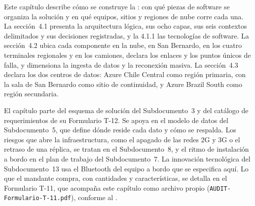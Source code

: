 %
\ProvideDocumentCommand{}
\ProvideDocumentCommand{}

Este capítulo describe cómo se construye la : con qué piezas de software se organiza
la solución y en qué equipos, sitios y regiones de nube corre cada una. La sección~4.1 presenta la
arquitectura lógica, sus ocho capas, sus seis contextos delimitados y sus decisiones registradas, y la
4.1.1 las tecnologías de software. La sección~4.2 ubica cada componente en la nube, en San Bernardo,
en los cuatro terminales regionales y en los camiones, declara los enlaces y los puntos únicos de
falla, y dimensiona la ingesta de datos y la reconexión masiva. La sección~4.3 declara los dos
centros de datos: Azure Chile Central como región primaria, con la sala de San Bernardo como sitio de
continuidad, y Azure Brazil South como región secundaria.

El capítulo parte del esquema de solución del Subdocumento~3 y del catálogo de requerimientos de su
Formulario T-12. Se apoya en el modelo de datos del Subdocumento~5, que define dónde reside cada dato
y cómo se respalda. Los riesgos que abre la infraestructura, como el apagado de las redes 2G y 3G o el
retraso de una réplica, se tratan en el Subdocumento~8, y el ritmo de instalación a bordo en el plan
de trabajo del Subdocumento~7. La innovación tecnológica del Subdocumento~13 usa el Bluetooth del
equipo a bordo que se especifica aquí. Lo que el mandante compra, con cantidades y características, se
detalla en el Formulario T-11, que acompaña este capítulo como archivo propio
(\texttt{AUDIT-Formulario-T-11.pdf}), conforme al .

